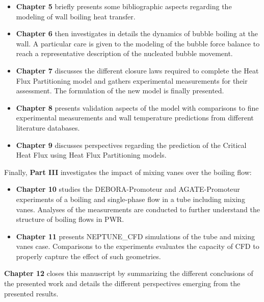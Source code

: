 \begin{itemize}
\item \textbf{Chapter 5} briefly presents some bibliographic aspects regarding the modeling of wall boiling heat transfer.

\item \textbf{Chapter 6} then investigates in details the dynamics of bubble boiling at the wall. A particular care is given to the modeling of the bubble force balance to reach a representative description of the nucleated bubble movement.

\item \textbf{Chapter 7} discusses the different closure laws required to complete the Heat Flux Partitioning model and gathers experimental measurements for their assessment. The formulation of the new model is finally presented.

\item \textbf{Chapter 8} presents validation aspects of the model with comparisons to fine experimental measurements and wall temperature predictions from different literature databases.

\item \textbf{Chapter 9} discusses perspectives regarding the prediction of the Critical Heat Flux using Heat Flux Partitioning models.
\end{itemize}

Finally, \textbf{Part III} investigates the impact of mixing vanes over the boiling flow:

\begin{itemize}
\item \textbf{Chapter 10} studies the DEBORA-Promoteur and AGATE-Promoteur experiments of a boiling and single-phase flow in a tube including mixing vanes. Analyses of the measurements are conducted to further understand the structure of boiling flows in PWR.

\item \textbf{Chapter 11} presents NEPTUNE\_CFD simulations of the tube and mixing vanes case. Comparisons to the experiments evaluates the capacity of CFD to properly capture the effect of such geometries.
\end{itemize}

\textbf{Chapter 12} closes this manuscript by summarizing the different conclusions of the presented work and details the different perspectives emerging from the presented results.